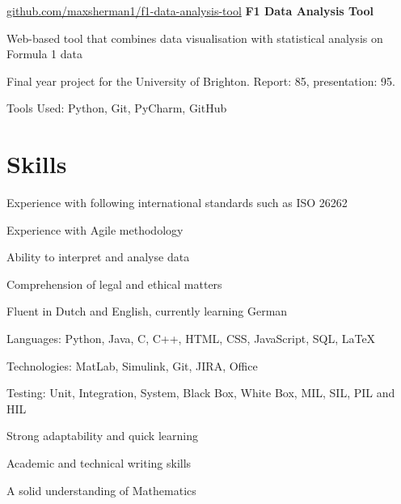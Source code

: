 	\vspace{0.2 cm}	
	
	\begin{splitcolentry}{
			\href{https://github.com/maxsherman1/f1-data-analysis-tool}{github.com/maxsherman1/f1-data-analysis-tool}
		}
		\textbf{F1 Data Analysis Tool}
	\end{splitcolentry}
	
	\vspace{0.10 cm}
	\begin{onecolentry}
		\begin{highlights}
			\item Web-based tool that combines data visualisation with statistical analysis on Formula 1 data
			\item Final year project for the University of Brighton. Report: 85, presentation: 95.
			\item Tools Used: Python, Git, PyCharm, GitHub
		\end{highlights}
	\end{onecolentry}
	
	\section{Skills}
	
	\begin{splitcolentry}{
			\begin{highlights}
				\item Experience with following international standards such as ISO 26262
				\item Experience with Agile methodology 
				\item Ability to interpret and analyse data
				\item Comprehension of legal and ethical matters
				\item Fluent in Dutch and English, currently learning German
			\end{highlights}
		}
		\begin{highlights}
			\item Languages: Python, Java, C, C++, HTML, CSS, JavaScript, SQL, LaTeX
			\item Technologies: MatLab, Simulink, Git, JIRA, Office
			\item Testing: Unit, Integration, System, Black Box, White Box, MIL, SIL, PIL and HIL
			\item Strong adaptability and quick learning
			\item Academic and technical writing skills
			\item A solid understanding of Mathematics
		\end{highlights}
	\end{splitcolentry}
	
